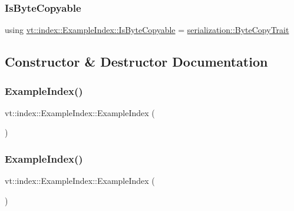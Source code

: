 \subsubsection{\texorpdfstring{Is\+Byte\+Copyable}{IsByteCopyable}}
{\footnotesize\ttfamily using \hyperlink{structvt_1_1index_1_1_example_index_ad880d8cf1bf3b66795a9b9c5ffd7a3eb}{vt\+::index\+::\+Example\+Index\+::\+Is\+Byte\+Copyable} =  \hyperlink{structvt_1_1serialization_1_1_byte_copy_trait}{serialization\+::\+Byte\+Copy\+Trait}}



\subsection{Constructor \& Destructor Documentation}
\mbox{\label{structvt_1_1index_1_1_example_index_ae95bfbbb43c57658ebd5b15bdbb8dac0}} 
\subsubsection{\texorpdfstring{Example\+Index()}{ExampleIndex()}\hspace{0.1cm}{\footnotesize\ttfamily [1/2]}}
{\footnotesize\ttfamily vt\+::index\+::\+Example\+Index\+::\+Example\+Index (\begin{DoxyParamCaption}{ }\end{DoxyParamCaption})\hspace{0.3cm}{\ttfamily [default]}}

\mbox{\label{structvt_1_1index_1_1_example_index_af4f0e1862469d47eb715ae553284d826}} 
\subsubsection{\texorpdfstring{Example\+Index()}{ExampleIndex()}\hspace{0.1cm}{\footnotesize\ttfamily [2/2]}}
{\footnotesize\ttfamily vt\+::index\+::\+Example\+Index\+::\+Example\+Index (\begin{DoxyParamCaption}\item[{\hyperlink{structvt_1_1index_1_1_example_index}{Example\+Index} const \&}]{ }\end{DoxyParamCaption})\hspace{0.3cm}{\ttfamily [default]}}



